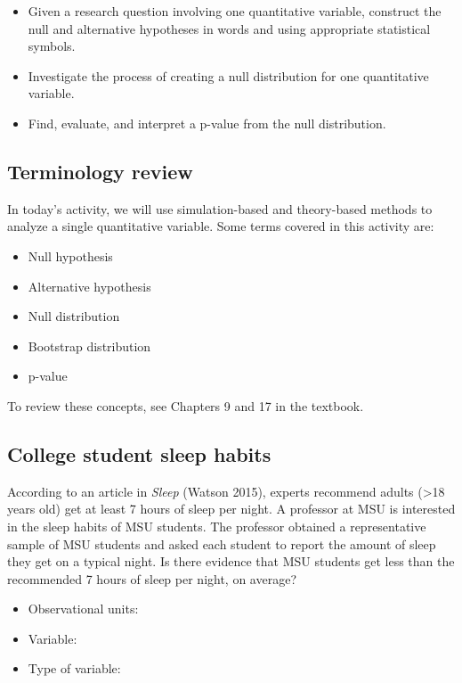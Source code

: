 \documentclass[
]{report}
\begin{document}
\begin{itemize}
\item
  Given a research question involving one quantitative variable, construct the null and alternative hypotheses
  in words and using appropriate statistical symbols.
\item
  Investigate the process of creating a null distribution for one quantitative variable.
\item
  Find, evaluate, and interpret a p-value from the null distribution.
\end{itemize}

\subsection{Terminology review}\label{terminology-review-8}

In today's activity, we will use simulation-based and theory-based methods to analyze a single quantitative variable. Some terms covered in this activity are:

\begin{itemize}
\item
  Null hypothesis
\item
  Alternative hypothesis
\item
  Null distribution
\item
  Bootstrap distribution
\item
  p-value
\end{itemize}

To review these concepts, see Chapters 9 and 17 in the textbook.

\subsection{College student sleep habits}\label{college-student-sleep-habits}

According to an article in \emph{Sleep} (Watson 2015), experts recommend adults (\textgreater18 years old) get at least 7 hours of sleep per night. A professor at MSU is interested in the sleep habits of MSU students. The professor obtained a representative sample of MSU students and asked each student to report the amount of sleep they get on a typical night. Is there evidence that MSU students get less than the recommended 7 hours of sleep per night, on average?

\begin{itemize}
\item
  Observational units:
\item
  Variable:
\item
  Type of variable:
\end{itemize}
\end{document}
